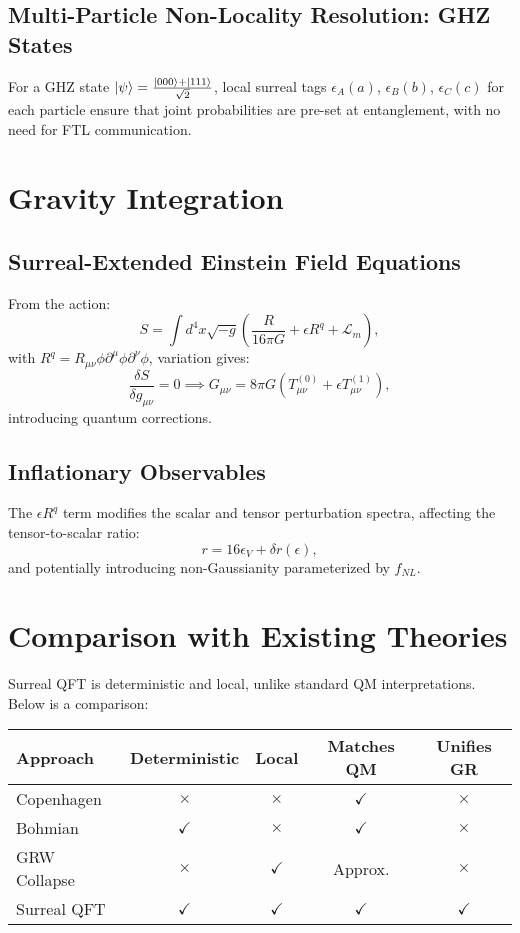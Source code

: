 \documentclass{article}
\begin{document}
\subsection{Multi-Particle Non-Locality Resolution: GHZ States}
For a GHZ state \(\ket{\psi} = \frac{\ket{000} + \ket{111}}{\sqrt{2}}\), local surreal tags \(\epsilon_A(a)\), \(\epsilon_B(b)\), \(\epsilon_C(c)\) for each particle ensure that joint probabilities are pre-set at entanglement, with no need for FTL communication.

\section{Gravity Integration}
\subsection{Surreal-Extended Einstein Field Equations}
From the action:
\begin{equation}
S = \int d^4x \sqrt{-g} \left( \frac{R}{16\pi G} + \epsilon R^q + \mathcal{L}_m \right),
\end{equation}
with \(R^q = R_{\mu\nu} \phi \partial^\mu \phi \partial^\nu \phi\), variation gives:
\begin{equation}
\frac{\delta S}{\delta g_{\mu\nu}} = 0 \implies G_{\mu\nu} = 8\pi G \left( T_{\mu\nu}^{(0)} + \epsilon T_{\mu\nu}^{(1)} \right),
\end{equation}
introducing quantum corrections.

\subsection{Inflationary Observables}
The \(\epsilon R^q\) term modifies the scalar and tensor perturbation spectra, affecting the tensor-to-scalar ratio:
\begin{equation}
r = 16 \epsilon_V + \delta r(\epsilon),
\end{equation}
and potentially introducing non-Gaussianity parameterized by \(f_{NL}\).

\section{Comparison with Existing Theories}
Surreal QFT is deterministic and local, unlike standard QM interpretations. Below is a comparison:
\begin{center}
\begin{tabular}{lcccc}
\hline
\textbf{Approach} & \textbf{Deterministic} & \textbf{Local} & \textbf{Matches QM} & \textbf{Unifies GR} \\
\hline
Copenhagen & $\times$ & $\times$ & $\checkmark$ & $\times$ \\
Bohmian & $\checkmark$ & $\times$ & $\checkmark$ & $\times$ \\
GRW Collapse & $\times$ & $\checkmark$ & Approx. & $\times$ \\
Surreal QFT & $\checkmark$ & $\checkmark$ & $\checkmark$ & $\checkmark$ \\
\hline
\end{tabular}
\end{center}
\end{document}
